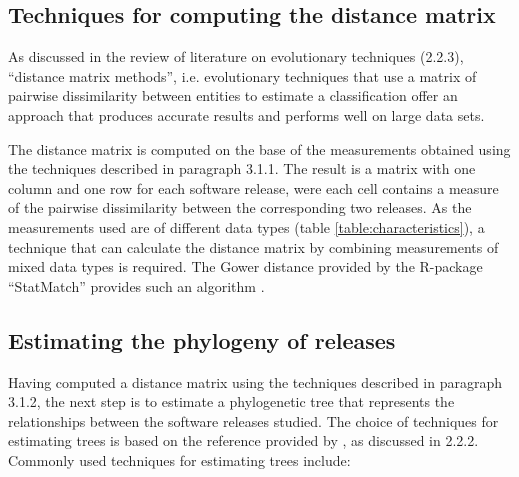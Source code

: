 \subsection{Techniques for computing the distance matrix}
As discussed in the review of literature on evolutionary techniques (2.2.3), “distance matrix methods”, i.e. evolutionary techniques that use a matrix of pairwise dissimilarity between entities to estimate a classification \citep{FelsensteinJ.andFelenstein2004a} offer an approach that produces accurate results and performs well on large data sets.

The distance matrix is computed on the base of the measurements obtained using the techniques described in paragraph 3.1.1. The result is a matrix with one column and one row for each software release, were each cell contains a measure of the pairwise dissimilarity between the corresponding two releases. As the measurements used are of different data types (table \ref{table:characteristics}), a technique that can calculate the distance matrix by combining measurements of mixed data types is required. The Gower distance provided by the R-package “StatMatch” provides such an algorithm \citep{DOrazio2016}.

\subsection{Estimating the phylogeny of releases}
Having computed a distance matrix using the techniques described in paragraph 3.1.2, the next step is to estimate a phylogenetic tree that represents the relationships between the software releases studied. The choice of techniques for estimating trees is based on the reference provided by \citet{Paradis2011}, as discussed in 2.2.2. Commonly used techniques for estimating trees include:

\begin{description}
 
 
 
\end{description}

